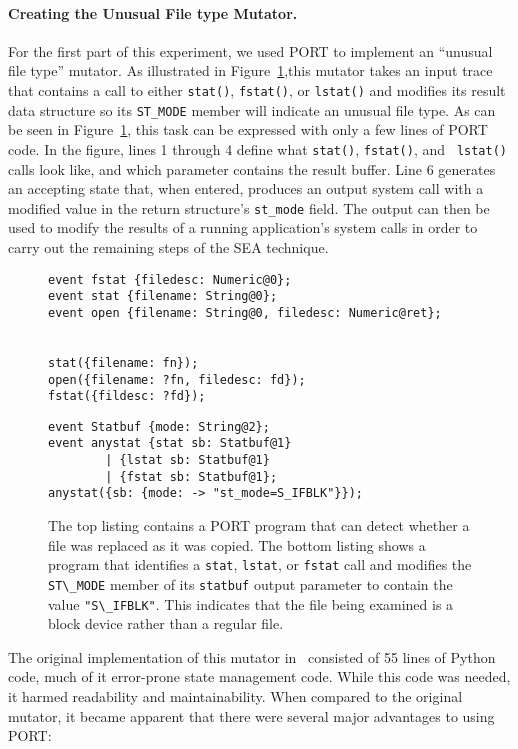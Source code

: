 \paragraph{Creating the Unusual File type Mutator.}
\label{subsub:UnusualFiletype}
For the first part of this experiment,
we used PORT to implement an ``unusual file type''
mutator.
As illustrated in Figure~\ref{lst:SEAListings},this mutator
takes an input trace
that contains a call to either {\tt stat()},
{\tt fstat()},
or {\tt lstat()}
and modifies its result data structure so
its {\tt ST\_MODE} member will indicate an unusual file type.
As can be seen in
Figure~\ref{lst:SEAListings}, this task can be expressed with only a few lines of PORT code.  In the figure,
lines 1 through 4 define what {\tt stat()}, {\tt fstat()}, and {\tt
lstat()} calls look like, and which parameter contains the result buffer.
Line 6 generates an accepting state that, when entered, produces an output
system call with a modified value in the return structure's {\tt st\_mode}
field.  The output can then be used to modify the results of a running
application's system calls in order to carry out the remaining steps of the
SEA technique.

\begin{figure}
\begin{lstlisting}[basicstyle=\ttfamily]
event fstat {filedesc: Numeric@0};
event stat {filename: String@0};
event open {filename: String@0, filedesc: Numeric@ret};


stat({filename: fn});
open({filename: ?fn, filedesc: fd});
fstat({fildesc: ?fd});
\end{lstlisting}
\begin{lstlisting}[basicstyle=\ttfamily]
event Statbuf {mode: String@2};
event anystat {stat sb: Statbuf@1}
        | {lstat sb: Statbuf@1}
        | {fstat sb: Statbuf@1};
anystat({sb: {mode: -> "st_mode=S_IFBLK"}});
\end{lstlisting}
\caption{The top listing contains a
PORT program that can detect whether a file was replaced as it was copied.
The bottom listing shows a program that
identifies a \texttt{stat}, \texttt{lstat}, or \texttt{fstat} call and modifies
  the \lstinline+ST\_MODE+ member of its \lstinline+statbuf+ output parameter to contain the value
  \lstinline+"S\_IFBLK"+. This indicates that the file being examined is a block device rather than a regular file.}
\label{lst:SEAListings}
\end{figure}

The original implementation of this mutator in~\cite{DBLP:conf/issre/MooreCFW19} consisted of 55 lines
of Python code, much of it error-prone state management code. While this code was needed, it harmed
readability and maintainability.
When compared to the original mutator, it became apparent that there were
several major advantages
to using
PORT:

